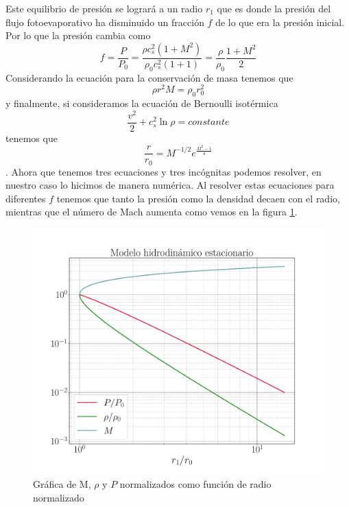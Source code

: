 \documentclass{book}
\begin{document}
Este equilibrio de presión se logrará a un radio $r_1$ que es donde la presión del flujo fotoevaporativo ha disminuido un fracción $f$ de lo que era la presión inicial. Por lo que la presión cambia como 
\begin{equation}\label{eq : 1}
f=\frac{P}{P_0}=\frac{\rho c_s^2(1+M^2)}{\rho_0 c_s^2(1+1)}=\frac{\rho}{\rho_0}\frac{1+M^2}{2}
\end{equation}
Considerando la ecuación para la conservación de masa tenemos que
\begin{equation}\label{eq : 2}
\rho r^2M	=\rho_0 r_0^2
\end{equation}
y finalmente, si consideramos la ecuación de Bernoulli isotérmica 
\[\frac{v^2}{2}+c_s^2\ln\rho=constante\]
tenemos que 
\begin{equation}\label{eq ; 3} \frac{r}{r_0}=M^{-1/2}e^{\frac{M^2-1}{4}}
\end{equation}
\citep{Dyson:1968}.
Ahora que tenemos tres ecuaciones y tres incógnitas podemos resolver, en nuestro caso lo hicimos de manera numérica. Al resolver estas ecuaciones para diferentes $f$ tenemos que tanto la presión como la densidad decaen con el radio, mientras que el número de Mach aumenta como vemos en la figura \ref{fig:grafica_C2}.

\begin{figure}[htb]
    \centering    \includegraphics[width=\textwidth]{Nuevas imagenes finales/C2_estructura.pdf}
    \caption{Gráfica de M, $\rho$ y $P$ normalizados como función de radio normalizado}
    \label{fig:grafica_C2}
\end{figure}
\end{document}
